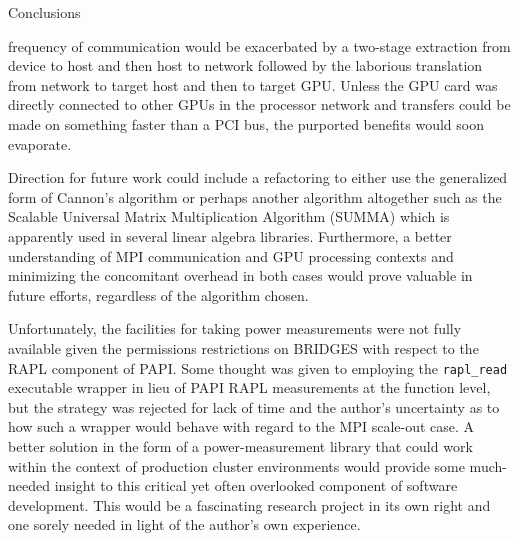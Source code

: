 \documentclass{article}
\begin{document}
\begin{section}{Conclusions}
\begin{paragraph}{}
      frequency of communication would be exacerbated by a two-stage extraction from device to host and then host to network followed by the
      laborious translation from network to target host and then to target GPU. Unless the GPU card was directly connected to other GPUs in the processor
      network and transfers could be made on something faster than a PCI bus, the purported benefits would soon evaporate.
    \end{paragraph}
    \begin{paragraph}{}
      Direction for future work could include a refactoring to either use the generalized form of Cannon's algorithm or perhaps another algorithm
      altogether such as the Scalable Universal Matrix Multiplication Algorithm (SUMMA)\autocite[][]{WikiCannonAlgo} which is apparently used in
      several linear algebra libraries. Furthermore, a better understanding of MPI communication and GPU processing contexts and minimizing the concomitant
      overhead in both cases would prove valuable in future efforts, regardless of the algorithm chosen.
    \end{paragraph}
    \begin{paragraph}{}
      Unfortunately, the facilities for taking power measurements were not fully available given the permissions restrictions on BRIDGES with respect
      to the RAPL component of PAPI. Some thought was given to employing the \texttt{rapl\_read} executable wrapper in lieu of PAPI RAPL measurements
      at the function level, but the strategy was rejected for lack of time and the author's uncertainty as to how such a wrapper would behave with
      regard to the MPI scale-out case. A better solution in the form of a power-measurement library that could work within the context of production
      cluster environments would provide some much-needed insight to this critical yet often overlooked component of software development.
      This would be a fascinating research project in its own right and one sorely needed in light of the author's own experience.
    \end{paragraph}
  \end{section}
\end{document}
